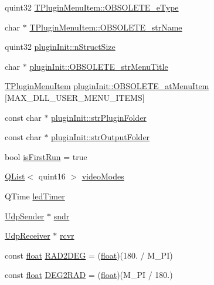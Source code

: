 \begin{DoxyCompactItemize}
quint32 \hyperlink{group___aero_sim_r_c_ga3182cdcc989c86e02f89dfc950a2d11e}{T\-Plugin\-Menu\-Item\-::\-O\-B\-S\-O\-L\-E\-T\-E\-\_\-e\-Type}
\item 
char $\ast$ \hyperlink{group___aero_sim_r_c_ga99ed050ca0dfe8088a93046f72c044e7}{T\-Plugin\-Menu\-Item\-::\-O\-B\-S\-O\-L\-E\-T\-E\-\_\-str\-Name}
\item 
quint32 \hyperlink{group___aero_sim_r_c_ga52e8965004a5543170823fdb54bee470}{plugin\-Init\-::n\-Struct\-Size}
\item 
char $\ast$ \hyperlink{group___aero_sim_r_c_ga03438bb42beb3367394a89c5f8b0d721}{plugin\-Init\-::\-O\-B\-S\-O\-L\-E\-T\-E\-\_\-str\-Menu\-Title}
\item 
\hyperlink{struct_t_plugin_menu_item}{T\-Plugin\-Menu\-Item} \hyperlink{group___aero_sim_r_c_ga587ecda1e1922299d622d31bf15c9f78}{plugin\-Init\-::\-O\-B\-S\-O\-L\-E\-T\-E\-\_\-at\-Menu\-Item} \mbox{[}M\-A\-X\-\_\-\-D\-L\-L\-\_\-\-U\-S\-E\-R\-\_\-\-M\-E\-N\-U\-\_\-\-I\-T\-E\-M\-S\mbox{]}
\item 
const char $\ast$ \hyperlink{group___aero_sim_r_c_ga1ea4ae7485e88859f164a5e904600834}{plugin\-Init\-::str\-Plugin\-Folder}
\item 
const char $\ast$ \hyperlink{group___aero_sim_r_c_ga9149810daf40b3b4e5f706faaa8dcc8f}{plugin\-Init\-::str\-Output\-Folder}
\item 
bool \hyperlink{group___aero_sim_r_c_gae612ff4fcd9d86f5ce097c2583d2bfee}{is\-First\-Run} = true
\item 
\hyperlink{class_q_list}{Q\-List}$<$ quint16 $>$ \hyperlink{group___aero_sim_r_c_ga56a26014d5fb746423472ca6301beff3}{video\-Modes}
\item 
Q\-Time \hyperlink{group___aero_sim_r_c_ga56b5b977fe04df5bdb2e4ea63b385692}{led\-Timer}
\item 
\hyperlink{class_udp_sender}{Udp\-Sender} $\ast$ \hyperlink{group___aero_sim_r_c_ga74a874f84e60aa753bdb56cd47d55d8b}{sndr}
\item 
\hyperlink{class_udp_receiver}{Udp\-Receiver} $\ast$ \hyperlink{group___aero_sim_r_c_gaad1d57ea59d2f9fca3e53c6fb20ac134}{rcvr}
\item 
const \hyperlink{_super_l_u_support_8h_a6a1bb6ed41f44b60e7bd83b0e9945aa7}{float} \hyperlink{group___aero_sim_r_c_gabb429aecc5bba8de3564e19ded7ef104}{R\-A\-D2\-D\-E\-G} = (\hyperlink{_super_l_u_support_8h_a6a1bb6ed41f44b60e7bd83b0e9945aa7}{float})(180. / M\-\_\-\-P\-I)
\item 
const \hyperlink{_super_l_u_support_8h_a6a1bb6ed41f44b60e7bd83b0e9945aa7}{float} \hyperlink{group___aero_sim_r_c_gacbfd2fc3314cc3762ea0c3720979f8bc}{D\-E\-G2\-R\-A\-D} = (\hyperlink{_super_l_u_support_8h_a6a1bb6ed41f44b60e7bd83b0e9945aa7}{float})(M\-\_\-\-P\-I / 180.)

\end{DoxyCompactItemize}
